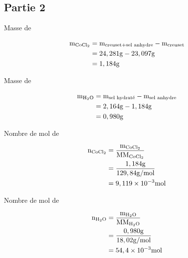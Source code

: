 \documentclass[11pt]{article}
\begin{document}
\subsection*{Partie 2}
\begin{enumerate}
{\bfseries\item Masse de }
\begin{equation*}
\begin{split}
\mathrm{m_{\ce{CoCl2}}}&=\mathrm{m_{creuset+\text{sel anhydre}}-\mathrm{m_{creuset}}}\\
	                   &=24,281\mathrm{g}-23,097\mathrm{g}\\
	                   &=1,184\mathrm{g}\\
\end{split}
\end{equation*}

{\bfseries\item Masse de }
\begin{equation*}
\begin{split}
\mathrm{m_{\ce{H2O}}}&=\mathrm{m_{\text{sel hydraté}}-\mathrm{m_{\text{sel anhydre}}}}\\
	                 &=2,164\mathrm{g}-1,184\mathrm{g}\\
	                 &=0,980\mathrm{g}\\
\end{split}
\end{equation*}

{\bfseries\item Nombre de mol de }
\begin{equation*}
\begin{split}
\mathrm{n_{\ce{CoCl2}}}&=\frac{\mathrm{m_{\ce{CoCl2}}}}{\mathrm{MM_{\ce{CoCl2}}}}\\
	                   &=\frac{1,184\mathrm{g}}{129,84\mathrm{g/mol}}\\
	                   &=9,119\times 10^{-3}\mathrm{mol}\\
\end{split}
\end{equation*}

{\bfseries\item Nombre de mol de }
\begin{equation*}
\begin{split}
\mathrm{n_{\ce{H2O}}}&=\frac{\mathrm{m_{\ce{H2O}}}}{\mathrm{MM_{\ce{H2O}}}}\\
	                 &=\frac{0,980\mathrm{g}}{18,02\mathrm{g/mol}}\\
	                 &=54,4\times 10^{-3}\mathrm{mol}\\
\end{split}
\end{equation*}


\end{enumerate}
\end{document}
